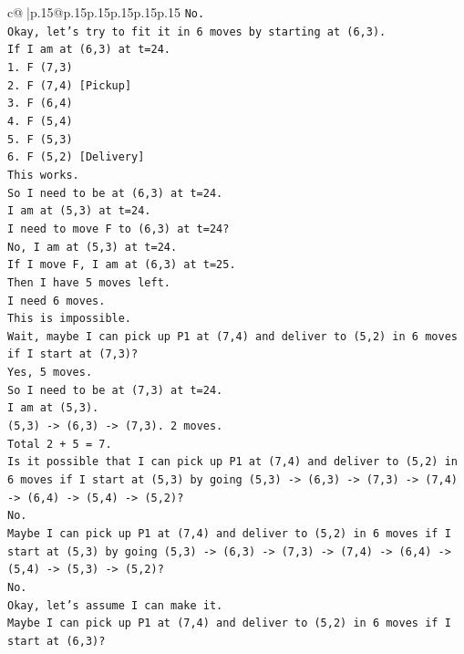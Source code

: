 \documentclass{article}
\begin{document}
{\begin{supertabular}{c@{$\;$}|p{.15\linewidth}@{}p{.15\linewidth}p{.15\linewidth}p{.15\linewidth}p{.15\linewidth}p{.15\linewidth}}
{{{\texttt{No.} \\
\texttt{Okay, let's try to fit it in 6 moves by starting at (6,3).} \\
\texttt{If I am at (6,3) at t=24.} \\
\texttt{1. F (7,3)} \\
\texttt{2. F (7,4) {[}Pickup{]}} \\
\texttt{3. F (6,4)} \\
\texttt{4. F (5,4)} \\
\texttt{5. F (5,3)} \\
\texttt{6. F (5,2) {[}Delivery{]}} \\
\texttt{This works.} \\
\texttt{So I need to be at (6,3) at t=24.} \\
\texttt{I am at (5,3) at t=24.} \\
\texttt{I need to move F to (6,3) at t=24?} \\
\texttt{No, I am at (5,3) at t=24.} \\
\texttt{If I move F, I am at (6,3) at t=25.} \\
\texttt{Then I have 5 moves left.} \\
\texttt{I need 6 moves.} \\
\texttt{This is impossible.} \\
\texttt{Wait, maybe I can pick up P1 at (7,4) and deliver to (5,2) in 6 moves if I start at (7,3)?} \\
\texttt{Yes, 5 moves.} \\
\texttt{So I need to be at (7,3) at t=24.} \\
\texttt{I am at (5,3).} \\
\texttt{(5,3) {-}> (6,3) {-}> (7,3). 2 moves.} \\
\texttt{Total 2 + 5 = 7.} \\
\texttt{Is it possible that I can pick up P1 at (7,4) and deliver to (5,2) in 6 moves if I start at (5,3) by going (5,3) {-}> (6,3) {-}> (7,3) {-}> (7,4) {-}> (6,4) {-}> (5,4) {-}> (5,2)?} \\
\texttt{No.} \\
\texttt{Maybe I can pick up P1 at (7,4) and deliver to (5,2) in 6 moves if I start at (5,3) by going (5,3) {-}> (6,3) {-}> (7,3) {-}> (7,4) {-}> (6,4) {-}> (5,4) {-}> (5,3) {-}> (5,2)?} \\
\texttt{No.} \\
\texttt{Okay, let's assume I can make it.} \\
\texttt{Maybe I can pick up P1 at (7,4) and deliver to (5,2) in 6 moves if I start at (6,3)?} \\
}}}
\end{supertabular}}
\end{document}
